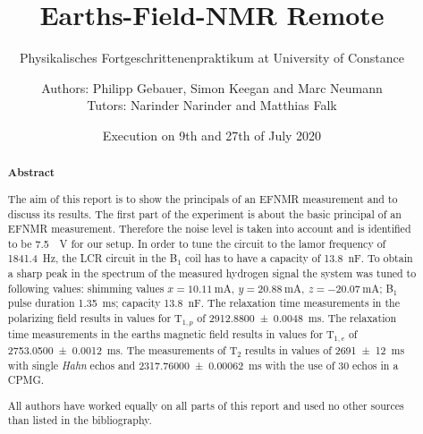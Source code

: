 \title{Earths-Field-NMR Remote}
\subtitle{Physikalisches Fortgeschrittenenpraktikum at University of Constance}
\author{Authors: Philipp Gebauer, Simon Keegan and Marc Neumann \\ \large{Tutors: Narinder Narinder and Matthias Falk}}
\date{Execution on 9th and 27th of July 2020}
\maketitle
\begin{abstract}
    \begin{center}
        \Large{\textsf{\textbf{Abstract}}}
    \end{center}
    \vspace{0.75 cm}
    \begin{singlespace}
    \noindent The aim of this report is to show the principals of an EFNMR measurement and to discuss its results.\newline
    The first part of the experiment is about the basic principal of an EFNMR measurement. Therefore the noise level is taken into account and is identified to be \SI{7.5}{\mu \volt} for our setup. In order to tune the circuit to the lamor frequency of \SI{1841.4}{\hertz}, the LCR circuit in the B$_1$ coil has to have a capacity of \SI{13.8}{\nano \farad}. To obtain a sharp peak in the spectrum of the measured hydrogen signal the system was tuned to following values: shimming values $x = \SI{10.11}{\milli \ampere}, \ y = \SI{20.88}{\milli \ampere}, \ z = \SI{-20.07}{\milli \ampere}$; B$_1$ pulse duration \SI{1.35}{\milli \second}; capacity \SI{13.8}{\nano \farad}. The relaxation time measurements in the polarizing field results in values for T$_{1,p}$ of \SI{2912.8800 \pm 0.0048}{\milli \second}. The relaxation time measurements in the earths magnetic field results in values for T$_{1,e}$ of \SI{2753.0500 \pm 0.0012}{\milli \second}. The measurements of T$_2$ results in values of \SI{2691 \pm 12}{\milli \second} with single \textit{Hahn} echos and \SI{2317.76000 \pm 0.00062}{\milli \second} with the use of 30 echos in a CPMG.
    \vspace{0.75 cm}
     
    \noindent All authors have worked equally on all parts of this report and used no other sources than listed in the bibliography.

\end{singlespace}
\end{abstract}

\thispagestyle{empty}
\newpage
